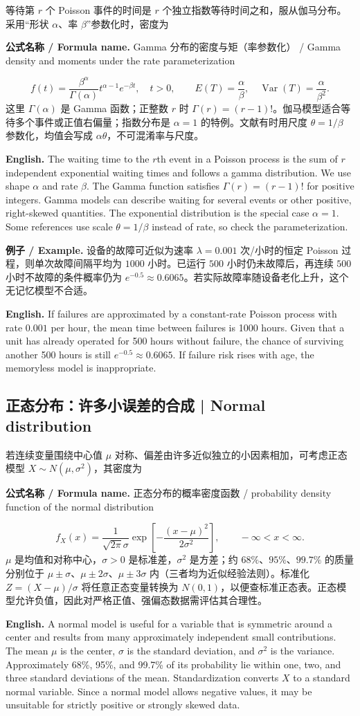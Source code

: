 \documentclass[UTF8,11pt,a4paper]{ctexart}
\newcommand{\EN}[1]{\par\noindent\textbf{English.} #1\par}
\newcommand{\FORMULA}[2]{\par\noindent\textbf{公式名称 / Formula name.} #1 / #2\par}
\newcommand{\EX}[2]{\par\noindent\textbf{例子 / Example.} #1\par\EN{#2}}
\begin{document}
等待第 $r$ 个 Poisson 事件的时间是 $r$ 个独立指数等待时间之和，服从伽马分布。采用“形状 $\alpha$、率 $\beta$”参数化时，密度为
\FORMULA{Gamma 分布的密度与矩（率参数化）}{Gamma density and moments under the rate parameterization}
\[
f(t)=\frac{\beta^\alpha}{\Gamma(\alpha)}t^{\alpha-1}e^{-\beta t},\quad t>0,
\qquad E(T)=\frac{\alpha}{\beta},\quad \operatorname{Var}(T)=\frac{\alpha}{\beta^2}.
\]
这里 $\Gamma(\alpha)$ 是 Gamma 函数；正整数 $r$ 时 $\Gamma(r)=(r-1)!$。伽马模型适合等待多个事件或正值右偏量；指数分布是 $\alpha=1$ 的特例。文献有时用尺度 $\theta=1/\beta$ 参数化，均值会写成 $\alpha\theta$，不可混淆率与尺度。
\EN{The waiting time to the $r$th event in a Poisson process is the sum of $r$ independent exponential waiting times and follows a gamma distribution. We use shape $\alpha$ and rate $\beta$. The Gamma function satisfies $\Gamma(r)=(r-1)!$ for positive integers. Gamma models can describe waiting for several events or other positive, right-skewed quantities. The exponential distribution is the special case $\alpha=1$. Some references use scale $\theta=1/\beta$ instead of rate, so check the parameterization.}

\EX{设备的故障可近似为速率 $\lambda=0.001$ 次/小时的恒定 Poisson 过程，则单次故障间隔平均为 $1000$ 小时。已运行 $500$ 小时仍未故障后，再连续 $500$ 小时不故障的条件概率仍为 $e^{-0.5}\approx0.6065$。若实际故障率随设备老化上升，这个无记忆模型不合适。}{If failures are approximated by a constant-rate Poisson process with rate $0.001$ per hour, the mean time between failures is 1000 hours. Given that a unit has already operated for 500 hours without failure, the chance of surviving another 500 hours is still $e^{-0.5}\approx0.6065$. If failure risk rises with age, the memoryless model is inappropriate.}

\subsection{正态分布：许多小误差的合成 | Normal distribution}
若连续变量围绕中心值 $\mu$ 对称、偏差由许多近似独立的小因素相加，可考虑正态模型 $X\sim N(\mu,\sigma^2)$，其密度为
\FORMULA{正态分布的概率密度函数}{probability density function of the normal distribution}
\[
f_X(x)=\frac{1}{\sqrt{2\pi}\sigma}\exp\!\left[-\frac{(x-\mu)^2}{2\sigma^2}\right],\qquad -\infty<x<\infty.
\]
$\mu$ 是均值和对称中心，$\sigma>0$ 是标准差，$\sigma^2$ 是方差；约 $68\%$、$95\%$、$99.7\%$ 的质量分别位于 $\mu\pm\sigma$、$\mu\pm2\sigma$、$\mu\pm3\sigma$ 内（三者均为近似经验法则）。标准化 $Z=(X-\mu)/\sigma$ 将任意正态变量转换为 $N(0,1)$，以便查标准正态表。正态模型允许负值，因此对严格正值、强偏态数据需评估其合理性。
\EN{A normal model is useful for a variable that is symmetric around a center and results from many approximately independent small contributions. The mean $\mu$ is the center, $\sigma$ is the standard deviation, and $\sigma^2$ is the variance. Approximately 68\%, 95\%, and 99.7\% of its probability lie within one, two, and three standard deviations of the mean. Standardization converts $X$ to a standard normal variable. Since a normal model allows negative values, it may be unsuitable for strictly positive or strongly skewed data.}
\end{document}
